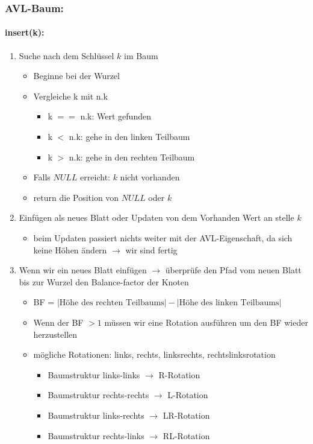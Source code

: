 \documentclass[a4paper,twoside,12pt]{article}
\begin{document}
\begin{description}
\subsubsection*{AVL-Baum:}
\paragraph{insert(k):}
\begin{enumerate}
	\item Suche nach dem Schlüssel $k$ im Baum
	\begin{itemize}
		\item Beginne bei der Wurzel
		\item Vergleiche k mit n.k
		\begin{itemize}
			\item k $==$ n.k: Wert gefunden
			\item k $<$ n.k: gehe in den linken Teilbaum
			\item k $>$ n.k: gehe in den rechten Teilbaum
		\end{itemize}
		\item Falls $NULL$ erreicht: $k$ nicht vorhanden
		\item return die Position von $NULL$ oder $k$
	\end{itemize}
	\item Einfügen als neues Blatt oder Updaten von dem Vorhanden Wert an stelle $k$
	\begin{itemize}
		\item beim Updaten passiert nichts weiter mit der AVL-Eigenschaft, da sich keine Höhen ändern $\rightarrow$ wir sind fertig
	\end{itemize}
	\item Wenn wir ein neues Blatt einfügen $\rightarrow$ überprüfe den Pfad vom neuen Blatt bis zur Wurzel den Balance-factor der Knoten 
	\begin{itemize}
		\item BF = $|\text{Höhe des rechten Teilbaums}| - |\text{Höhe des linken Teilbaums}|$
		\item Wenn der BF $> 1$ müssen wir eine Rotation ausführen um den BF wieder herzustellen 
		\item mögliche Rotationen: links, rechts, linksrechts, rechtslinksrotation
		\begin{itemize}
			\item Baumstruktur links-links $\rightarrow$ R-Rotation
			\item Baumstruktur rechts-rechts $\rightarrow$ L-Rotation
			\item Baumstruktur links-rechts $\rightarrow$ LR-Rotation
			\item Baumstruktur rechts-links $\rightarrow$ RL-Rotation
		\end{itemize}
	\end{itemize}
\end{enumerate}


\end{description}
\end{document}
